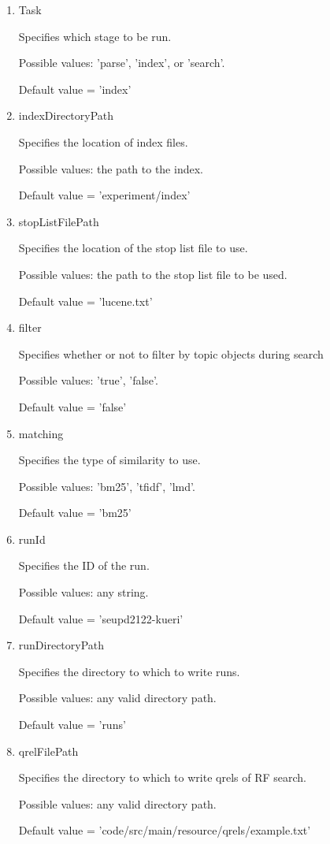     \begin{enumerate}
        \item Task
            
            Specifies which stage to be run.
            
            Possible values: 'parse', 'index', or 'search'.
    
            Default value = 'index'
        \item indexDirectoryPath
            
            Specifies the location of index files.
            
            Possible values: the path to the index.
            
            Default value = 'experiment/index'
        \item stopListFilePath
            
            Specifies the location of the stop list file to use.
        
            Possible values: the path to the stop list file to be used.
            
            Default value = 'lucene.txt'
        \item filter
            
            Specifies whether or not to filter by topic objects during search
            
            Possible values: 'true', 'false'.
            
            Default value = 'false'
        \item matching
            
            Specifies the type of similarity to use.
            
            Possible values: 'bm25', 'tfidf', 'lmd'.
            
            Default value = 'bm25'
        \item runId
            
            Specifies the ID of the run.
            
            Possible values: any string.
            
            Default value = 'seupd2122-kueri'
        \item runDirectoryPath
            
            Specifies the directory  to which to write runs.
            
            Possible values: any valid directory path.
            
            Default value = 'runs'
        \item qrelFilePath
            
            Specifies the directory to which to write qrels of RF search.
            
            Possible values: any valid directory path.
            
            Default value = 'code/src/main/resource/qrels/example.txt'

\end{enumerate}

